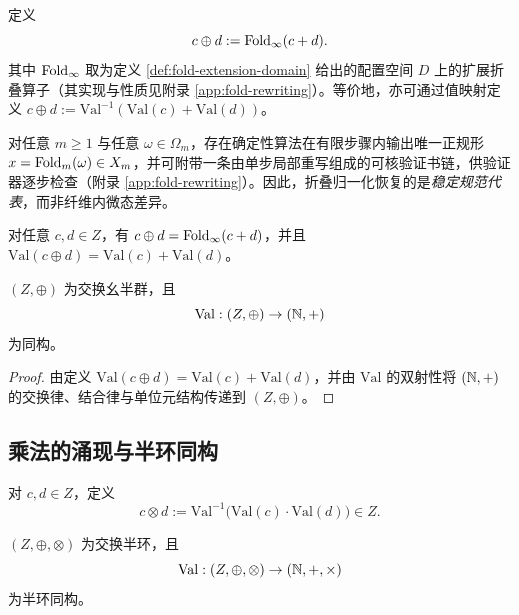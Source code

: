 \begin{definition}[稳定加法]\label{def:stable-add}
定义
$$
c\oplus d := \mathrm{Fold}_\infty(c+d).
$$
其中 $\mathrm{Fold}_\infty$ 取为定义 \ref{def:fold-extension-domain} 给出的配置空间 $D$ 上的扩展折叠算子（其实现与性质见附录 \ref{app:fold-rewriting}）。等价地，亦可通过值映射定义 $c\oplus d := \mathrm{Val}^{-1}(\mathrm{Val}(c)+\mathrm{Val}(d))$。
\end{definition}

\begin{proposition}[折叠归一化的算法命题]\label{prop:fold-normalize-alg}
对任意 $m\ge 1$ 与任意 $\omega\in\Omega_m$，存在确定性算法在有限步骤内输出唯一正规形 $x=\mathrm{Fold}_m(\omega)\in X_m$，并可附带一条由单步局部重写组成的可核验证书链，供验证器逐步检查（附录 \ref{app:fold-rewriting}）。因此，折叠归一化恢复的是\emph{稳定规范代表}，而非纤维内微态差异。
\end{proposition}

\begin{corollary}[折叠公式]\label{cor:fold-add}
对任意 $c,d\in Z$，有 $c\oplus d=\mathrm{Fold}_\infty(c+d)$，并且 $\mathrm{Val}(c\oplus d)=\mathrm{Val}(c)+\mathrm{Val}(d)$。
\end{corollary}

\begin{theorem}[加法的定义性同构]\label{thm:add-isom}
$(Z,\oplus)$ 为交换幺半群，且
$$
\mathrm{Val}:(Z,\oplus)\to(\mathbb{N},+)
$$
为同构。
\end{theorem}

\begin{proof}
由定义 $\mathrm{Val}(c\oplus d)=\mathrm{Val}(c)+\mathrm{Val}(d)$，并由 $\mathrm{Val}$ 的双射性将 $(\mathbb{N},+)$ 的交换律、结合律与单位元结构传递到 $(Z,\oplus)$。
\end{proof}

\subsection{乘法的涌现与半环同构}
\begin{definition}[稳定乘法]\label{def:stable-mul}
对 $c,d\in Z$，定义
$$
c\otimes d := \mathrm{Val}^{-1}\bigl(\mathrm{Val}(c)\cdot \mathrm{Val}(d)\bigr)\in Z.
$$
\end{definition}

\begin{theorem}[乘法的定义性同构]\label{thm:mul-isom}
$(Z,\oplus,\otimes)$ 为交换半环，且
$$
\mathrm{Val}:(Z,\oplus,\otimes)\to (\mathbb{N},+,\times)
$$
为半环同构。
\end{theorem}

